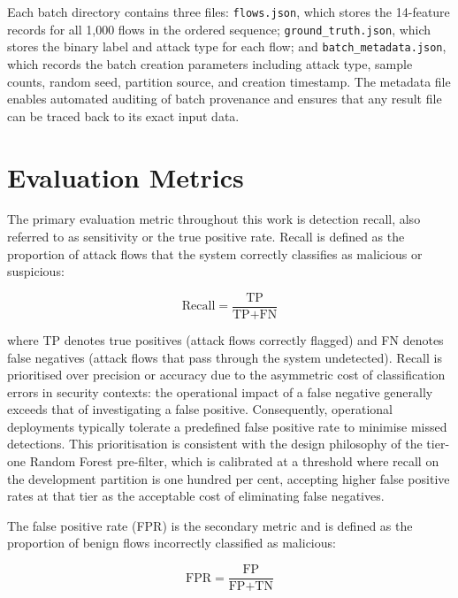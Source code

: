\documentclass[../main.tex]{subfiles}
\begin{document}
Each batch directory contains three files: \texttt{flows.json}, which stores the 14-feature records for all 1,000 flows in the ordered sequence; \texttt{ground\_truth.json}, which stores the binary label and attack type for each flow; and \texttt{batch\_metadata.json}, which records the batch creation parameters including attack type, sample counts, random seed, partition source, and creation timestamp. The metadata file enables automated auditing of batch provenance and ensures that any result file can be traced back to its exact input data.

\section{Evaluation Metrics}
\label{sec:evaluation-metrics}

The primary evaluation metric throughout this work is detection recall, also referred to as sensitivity or the true positive rate. Recall is defined as the proportion of attack flows that the system correctly classifies as malicious or suspicious:

\begin{equation}
\text{Recall} = \frac{\text{TP}}{\text{TP} + \text{FN}}
\label{eq:recall}
\end{equation}

\noindent where TP denotes true positives (attack flows correctly flagged) and FN denotes false negatives (attack flows that pass through the system undetected). Recall is prioritised over precision or accuracy due to the asymmetric cost of classification errors in security contexts: the operational impact of a false negative generally exceeds that of investigating a false positive. Consequently, operational deployments typically tolerate a predefined false positive rate to minimise missed detections. This prioritisation is consistent with the design philosophy of the tier-one Random Forest pre-filter, which is calibrated at a threshold where recall on the development partition is one hundred per cent, accepting higher false positive rates at that tier as the acceptable cost of eliminating false negatives.

The false positive rate (FPR) is the secondary metric and is defined as the proportion of benign flows incorrectly classified as malicious:

\begin{equation}
\text{FPR} = \frac{\text{FP}}{\text{FP} + \text{TN}}
\label{eq:fpr}
\end{equation}
\end{document}
